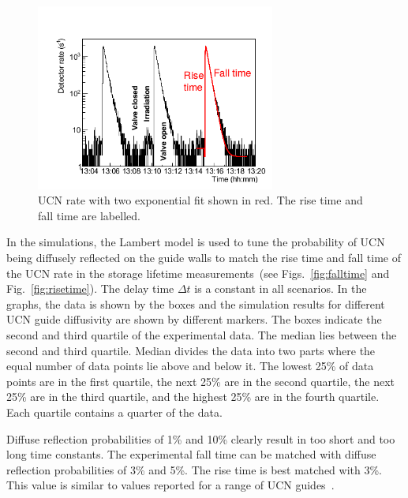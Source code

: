 \begin{figure}[h!]
  \centering
  \includegraphics[width=0.7\textwidth]{risefalltime.png}
  \caption[UCN cycle with a two exponential fit]{UCN rate with two
    exponential fit shown in red. The rise time and fall time are
    labelled.}
  \label{fig:risefalltime}
\end{figure}

In the simulations, the Lambert model is used to tune the probability
of UCN being diffusely reflected on the guide walls to match the rise
time and fall time of the UCN rate in the storage lifetime
measurements~(see Figs.~\ref{fig:falltime} and
Fig.~\ref{fig:risetime}).  The delay time $\Delta t$ is a constant in
all scenarios.  In the graphs, the data is shown by the boxes and the
simulation results for different UCN guide diffusivity are shown by
different markers. The boxes indicate the second and third quartile of
the experimental data. The median lies between the second and third
quartile. Median divides the data into two parts where the equal
number of data points lie above and below it. The lowest 25\% of data
points are in the first quartile, the next 25\% are in the second
quartile, the next 25\% are in the third quartile, and the highest
25\% are in the fourth quartile. Each quartile contains a quarter of
the data.


Diffuse reflection probabilities of 1\% and 10\% clearly result in too
short and too long time constants. The experimental fall time can be
matched with diffuse reflection probabilities of 3\% and 5\%. The rise
time is best matched with 3\%. This value is similar to values
reported for a range of UCN
guides~\cite{DAUM201471,Wlokka2017,Atchison2010}.




